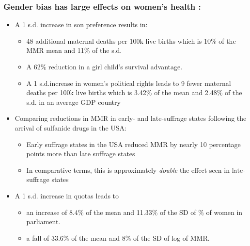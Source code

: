 \documentclass[10pt,letterpaper,subeqn]{beamer}
\begin{document}
\begin{frame}
\frametitle{Gender bias has large effects on women's health :}
\begin{itemize}
	\item A 1 s.d. increase in son preference results in:
	\begin{itemize}
		\item 48 additional maternal deaths per 100k live births which is 10\% of the MMR mean and 11\% of the s.d.
		\item A 62\% reduction in a girl child's survival advantage.  
		\item A 1 s.d.increase in women's political rights leads to 9 fewer maternal deaths per 100k live births which is 3.42\% of the mean and 2.48\% of the s.d. in an average GDP country
	\end{itemize}
	\item Comparing reductions in MMR in early- and late-suffrage states following the arrival of sulfanide drugs in the USA:
		
\begin{itemize}
		\item Early suffrage states in the USA reduced MMR by nearly 10 percentage points more than late suffrage states
		\item In comparative terms, this is approximately \emph{double} the effect seen in late-suffrage states
\end{itemize}

		\item A 1 s.d. increase in quotas leads to
		\begin{itemize}
		\item an increase of 8.4\% of the mean and 11.33\% of the SD of \% of women in parliament.
		\item a fall of 33.6\% of the mean and 8\% of the SD of log of MMR.
\end{itemize}
\end{itemize}
\end{frame}
\end{document}
